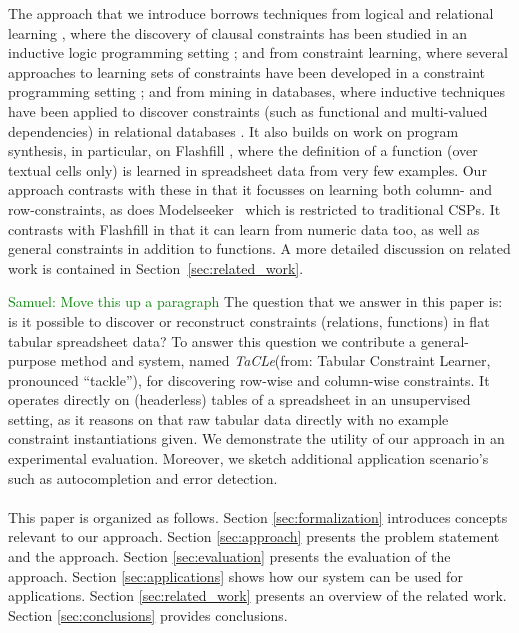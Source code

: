 \documentclass{IEEEtran}
\newcommand{\samuel}[1]{\textcolor{green}{{\sc Samuel:} #1}\xspace}
\newcommand{\tias}[1]{\textcolor{blue}{{\sc Tias:} #1}\xspace}
\newcommand{\format}[1]{\textit{#1}\xspace}
\newcommand{\sname}{\format{TaCLe}}
\theoremstyle{definition}
\begin{document}
The approach that we introduce borrows techniques from logical and relational learning \cite{luc_book}, where
the discovery of clausal constraints has been studied in an inductive logic programming setting \cite{claudien,lallouet}; and from constraint learning,  where several approaches to learning sets of constraints have been developed in a constraint programming setting \cite{Quacq,Conacq,modelseeker};
and from mining in databases, where inductive techniques have been applied to discover constraints (such as functional and multi-valued dependencies) in relational databases \cite{savnik}.  It also builds on work on program synthesis, in particular, on Flashfill \cite{flashfill}, where the definition of a function (over textual cells only) is learned in spreadsheet data from
very few examples.  Our approach contrasts with these in that it focusses
on learning both column- and row-constraints, as does Modelseeker~\cite{modelseeker} which is restricted to traditional CSPs. It contrasts with Flashfill in that it can learn from numeric data too, as well as general constraints in addition to functions.
A more detailed discussion on related work is contained in Section~\ref{sec:related_work}.

\samuel{Move this up a paragraph}
The question that we answer in this paper is: is it possible to discover or reconstruct constraints (relations, functions) in flat tabular spreadsheet data?
To answer this question we contribute a general-purpose method and system, named \sname (from: Tabular Constraint Learner, pronounced ``tackle''), for discovering row-wise and column-wise constraints.
It operates directly on (headerless) tables of a spreadsheet in an unsupervised setting, as it reasons on that raw tabular data directly with no example constraint instantiations given. %
We demonstrate the utility of our approach in an experimental evaluation.
Moreover, we sketch additional application scenario's such as autocompletion and error detection.
\\\\
This paper is organized as follows.
Section \ref{sec:formalization} introduces concepts relevant to our approach. Section \ref{sec:approach} presents the problem statement and the approach. Section \ref{sec:evaluation} presents the evaluation of the approach. Section \ref{sec:applications} shows how our system can be used for applications. Section \ref{sec:related_work} presents an overview of the related work. Section \ref{sec:conclusions} provides conclusions.
\end{document}
